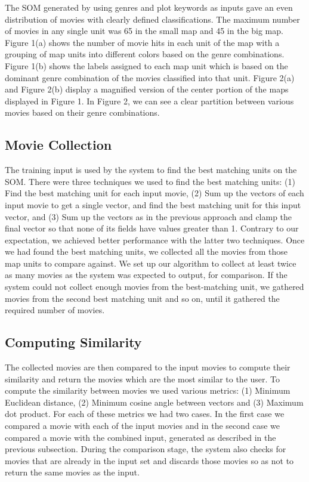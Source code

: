 \documentclass[conference]{IEEEtran}
\begin{document}
The SOM generated by using genres and plot keywords as inputs gave an even distribution of movies with clearly defined classifications. The maximum number of movies in any single unit was 65 in the small map and 45 in the big map. Figure 1(a) shows the number of movie hits in each unit of the map with a grouping of map units into different colors based on the genre combinations. Figure 1(b) shows the labels assigned to each map unit which is based on the dominant genre combination of the movies classified into that unit. Figure 2(a) and Figure 2(b) display a magnified version of the center portion of the maps displayed in Figure 1. In Figure 2, we can see a clear partition between various movies based on their genre combinations.

\subsection{Movie Collection}

The training input is used by the system to find the best matching units on the SOM. There were three techniques we used to find the best matching units: (1) Find the best matching unit for each input movie, (2) Sum up the vectors of each input movie to get a single vector, and find the best matching unit for this input vector, and (3) Sum up the vectors as in the previous approach and clamp the final vector so that none of its fields have values greater than 1. Contrary to our expectation, we achieved better performance with the latter two techniques. Once we had found the best matching units, we collected all the movies from those map units to compare against. We set up our algorithm to collect at least twice as many movies as the system was expected to output, for comparison. If the system could not collect enough movies from the best-matching unit, we gathered movies from the second best matching unit and so on, until it gathered the required number of movies.

\subsection{Computing Similarity}

The collected movies are then compared to the input movies to compute their similarity and return the movies which are the most similar to the user. To compute the similarity between movies we used various metrics: (1) Minimum Euclidean distance, (2) Minimum cosine angle between vectors and (3) Maximum dot product. For each of these metrics we had two cases. In the first case we compared a movie with each of the input movies and in the second case we compared a movie with the combined input, generated as described in the previous subsection. During the comparison stage, the system also checks for movies that are already in the input set and discards those movies so as not to return the same movies as the input.
\end{document}
